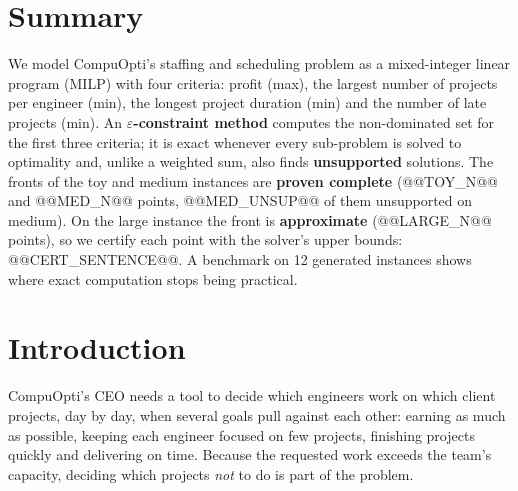 \documentclass[11pt,a4paper]{article}
\theoremstyle{plain}
\newcommand{\eps}{\varepsilon}
\begin{document}
\section*{Summary}
\noindent We model CompuOpti's staffing and scheduling problem as a mixed-integer linear program (MILP) with four criteria: profit (max), the largest number of projects per engineer (min), the longest project duration (min) and the number of late projects (min).
An \textbf{$\eps$-constraint method} computes the non-dominated set for the first three criteria; it is exact whenever every sub-problem is solved to optimality and, unlike a weighted sum, also finds \textbf{unsupported} solutions.
The fronts of the toy and medium instances are \textbf{proven complete} (@@TOY_N@@ and @@MED_N@@ points, @@MED_UNSUP@@ of them unsupported on medium).
On the large instance the front is \textbf{approximate} (@@LARGE_N@@ points), so we certify each point with the solver's upper bounds: @@CERT_SENTENCE@@.
A benchmark on 12 generated instances shows where exact computation stops being practical.

\vspace{10pt}
{\hypersetup{linkcolor=black}\setlength{\parskip}{0pt}\small\tableofcontents}
\newpage

\section{Introduction}

CompuOpti's CEO needs a tool to decide which engineers work on which client projects, day by day, when several goals pull against each other: earning as much as possible, keeping each engineer focused on few projects, finishing projects quickly and delivering on time. Because the requested work exceeds the team's capacity, deciding which projects \emph{not} to do is part of the problem.
\end{document}
